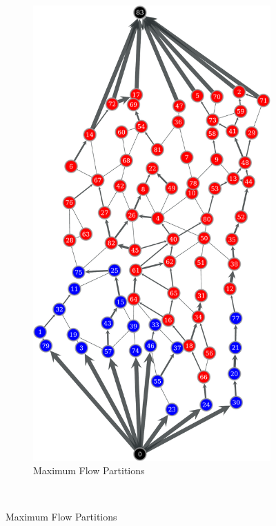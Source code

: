 \documentclass[titlepage]{article}
\begin{document}
    \begin{figure}
      \center
      \begin{subfigure}[b]{0.5\textwidth}
        \center
        \includegraphics[width=\textwidth]{figures/old_maxflow-crop.pdf}
        \caption{Maximum Flow Partitions}
        \label{fig:oldmaxflow}
      \end{subfigure}~

\end{figure}
\end{document}
